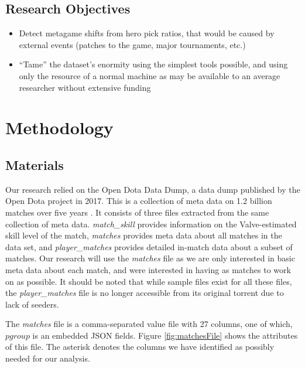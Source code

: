 \subsection{Research Objectives} %

\begin{itemize}
    \item Detect metagame shifts from hero pick ratios, that would be caused by external events (patches to the game, major tournaments, etc.)
    \item “Tame” the dataset’s enormity using the simplest tools possible, and using only the resource of a normal machine as may be available to an average researcher without extensive funding
\end{itemize}

\section{Methodology} %

\subsection{Materials} %

Our research relied on the Open Dota Data Dump, a data dump published by the Open Dota project in 2017. This is a collection of meta data on 1.2 billion matches over five years \cite{theopendotaprojectDataDumpMarch2017}. It consists of three files extracted from the same collection of meta data. \emph{match\_skill} provides information on the Valve-estimated skill level of the match, \emph{matches} provides meta data about all matches in the data set, and \emph{player\_matches} provides detailed in-match data about a subset of matches. Our research will use the \emph{matches} file as we are only interested in basic meta data about each match, and were interested in having as matches to work on as possible. It should be noted that while sample files exist for all these files, the \emph{player\_matches} file is no longer accessible from its original torrent due to lack of seeders.

The \emph{matches} file is a comma-separated value file with 27 columns, one of which, $pgroup$ is an embedded JSON fields. Figure \ref{fig:matchesFile} shows the attributes of this file. The asterisk denotes the columns we have identified as possibly needed for our analysis.

